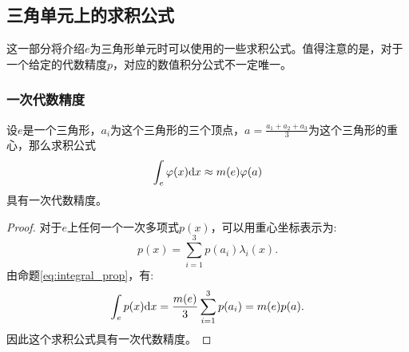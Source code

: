 \subsection{三角单元上的求积公式}
这一部分将介绍$e$为三角形单元时可以使用的一些求积公式。值得注意的是，对于一个给定的代数精度$p$，对应的数值积分公式不一定唯一。
\subsubsection{一次代数精度}
\begin{proposition}
    \label{prop:1order}
    设$e$是一个三角形，$a_{i}$为这个三角形的三个顶点，$a=\frac{a_{1}+a_{2}+a_{3}}{3}$为这个三角形的重心，那么求积公式
    \begin{equation}
        \int_{e}\varphi(x)\mathrm{d} x\approx m(e)\varphi(a)
    \end{equation}
    具有一次代数精度。
\end{proposition}
\begin{proof}
    对于$e$上任何一个一次多项式$p(x)$，可以用重心坐标表示为:
    \begin{equation}
        p(x)=\sum_{i=1}^{3}p(a_{i})\lambda_{i}(x).
    \end{equation}
    由命题\ref{eq:integral_prop}，有:
    \begin{equation}
        \int_{e}p(x)\mathrm{d} x=\frac{m(e)}{3}\sum_{i=1}^{3}p(a_{i})=m(e)p(a).
    \end{equation}
    因此这个求积公式具有一次代数精度。
\end{proof}
